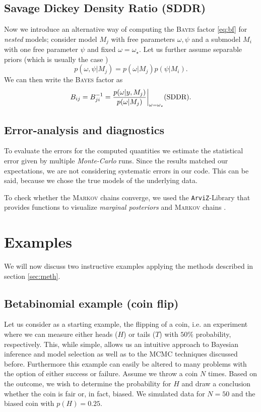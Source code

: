 \documentclass[%
 reprint,
 amsmath,amssymb,
 aps,
]{revtex4-1}
\begin{document}
\subsection{Savage Dickey Density Ratio (SDDR)} \label{subsec:sddr}
\noindent Now we introduce an alternative way of computing the \textsc{Bayes} factor \eqref{eq:bf} for \emph{nested} models; consider model $M_j$ with free parameters $\omega,\psi$ and a submodel $M_i$ with one free parameter $\psi$ and fixed $\omega=\omega_\star$. Let us further assume separable priors (which is usually the case \cite{trotta}) $$p(\omega,\psi|M_j)=p(\omega|M_j)p(\psi|M_i).$$
We can then write the \textsc{Bayes} factor as \cite{trotta} \begin{equation}
	\label{eq:sddr}
	B_{ij}=B_{ji}^{-1}=\frac{p(\omega|y,M_j)}{p(\omega|M_j)}\bigg|_{\omega=\omega_\star}  \text{\hfill (SDDR)}.
\end{equation}
\subsection{Error-analysis and diagnostics}
\noindent To evaluate the errors for the computed quantities we estimate the statistical error given by multiple \emph{Monte-Carlo} runs. Since the results matched our expectations, we are not considering systematic errors in our code. This can be said, because we chose the true models of the underlying data.

To check whether the \textsc{Markov} chains converge, we used the \texttt{ArviZ}-Library that provides functions to visualize \emph{marginal posteriors} and \textsc{Markov} chains \cite{ArviZ}. 
\section{Examples}\label{sec:examples}
\noindent We will now discuss two instructive examples applying the methods described in section \eqref{sec:meth}.

\subsection{Betabinomial example (coin flip)}\label{sec:coin}
\noindent Let us consider as a starting example, the flipping of a coin, i.e. an experiment where we can measure either heads ($H$) or tails ($T$) with $50\%$ probability, respectively. This, while simple, allows us an intuitive approach to Bayesian inference and model selection as well as to the MCMC techniques discussed before. Furthermore this example can easily be altered to many problems with the option of either success or failure. Assume we throw a coin $N$ times.  Based on the outcome, we wish to determine the probability for $H$ and draw a conclusion whether the coin is fair or, in fact, biased. We simulated data for $N=50$ and the biased coin with $p(H)=0.25$.
\end{document}
